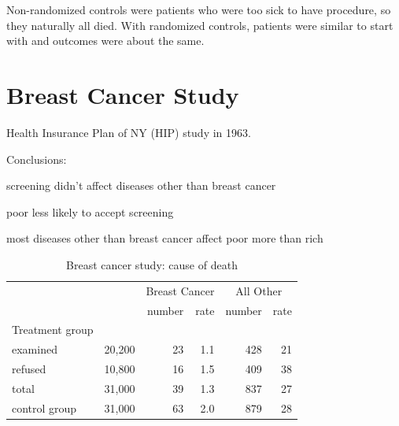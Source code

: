 \documentclass[landscape]{exam}
\begin{document}
  Non-randomized controls were patients who were too sick to have procedure, so
  they naturally all died.  With randomized controls, patients were similar to
  start with and outcomes were about the same.

  \section{Breast Cancer Study}
  Health Insurance Plan of NY (HIP) study in 1963.

  Conclusions:
  \begin{itemize*}
    \item screening didn't affect diseases other than breast cancer
    \item poor less likely to accept screening
    \item most diseases other than breast cancer affect poor more than rich
  \end{itemize*}

  \begin{table}
    \centering
    \begin{tabular}{lrrrrr}
      & & \multicolumn{2}{c}{Breast Cancer} & \multicolumn{2}{c}{All Other} \\
                               \cmidrule(r){3-4} \cmidrule(r){5-6}    
                      &        & number & rate & number & rate \\
      Treatment group \\
      examined        & 20,200 & 23     & 1.1  & 428    & 21 \\
      refused         & 10,800 & 16     & 1.5  & 409    & 38 \\
      total           & 31,000 & 39     & 1.3  & 837    & 27 \\
    \midrule
      control group   & 31,000 & 63     & 2.0  & 879    & 28 \\
    \end{tabular}
    \caption{Breast cancer study: cause of death}
    \label{tab:breast.cancer}
  \end{table}
\end{document}
